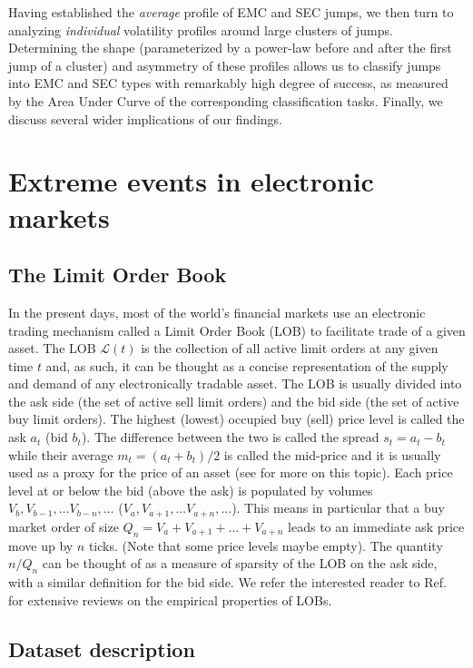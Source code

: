 \documentclass[amsmath,amssymb,aps,pre,floatfix,twocolumn,superscriptaddress]{revtex4}
\begin{document}
Having established the {\it average} profile of EMC and SEC jumps, we then turn to analyzing \emph{individual} volatility profiles around large clusters of jumps. Determining the shape (parameterized by a power-law before and after the first jump of a cluster) and asymmetry of these profiles allows us to classify jumps into EMC and SEC types with remarkably high degree of success, as measured by the Area Under Curve of the corresponding classification tasks. Finally, we discuss several wider implications of our findings.

\section{Extreme events in electronic markets}

\subsection{The Limit Order Book}

In the present days, most of the world’s financial markets use an electronic trading mechanism called a Limit Order Book (LOB) to facilitate trade of a given asset. 
The LOB $\mathcal{L}(t)$ is the collection of all active limit orders at any given time $t$ and, as such, it can be thought as a concise representation of the supply and demand of any electronically tradable asset. The LOB is usually divided into the ask side (the set of active sell limit orders) and the bid side (the set of active buy limit orders). The highest (lowest) occupied buy (sell) price level is called the ask $a_t$ (bid $b_t$). The difference between the two is called the spread $s_t = a_t-b_t$ while their average $m_t = (a_t+b_t)/2$ is called the mid-price and it is usually used as a proxy for the price of an asset (see \cite{micro_price} for more on this topic). 
Each price level at or below the bid (above the ask) is populated by volumes $V_b,V_{b-1}, \dots V_{b-n}, \dots$ ($V_a,V_{a+1}, \dots V_{a+n}, \dots$). This means in particular that a buy market order of size $Q_n=V_a+V_{a+1}+ \dots+ V_{a+n}$ leads to an immediate ask price move up by $n$ ticks. (Note that some price levels maybe empty). The quantity $n/Q_n$ can be thought of as a measure of sparsity of the LOB on the ask side, with a similar definition for the bid side. 
We refer the interested reader to Ref.~\cite{lob_review_1, lob_review_2, bouchaud2018trades} for extensive reviews on the empirical properties of LOBs.

\subsection{Dataset description}
\end{document}
